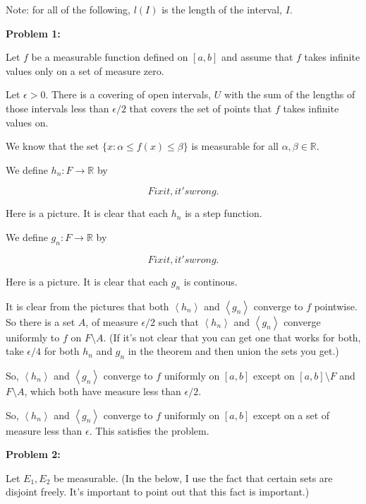 \documentclass[a4paper,12pt]{article}
\newcommand{\shunt}{\vspace{20mm}}
\newcommand{\anbrack}[1]{\left\langle #1 \right\rangle}
\newcommand{\al}{\alpha} %
\newcommand{\be}{\beta}
\newcommand{\ep}{\epsilon}
\newcommand{\R}{\mathbb{R}}
\begin{document}
Note: for all of the following, $l(I)$ is the length of the interval, $I$.

{\bf Problem 1:} %

Let $f$ be a measurable function defined on $[a,b]$ and assume that $f$ takes infinite values only on a set of measure zero. 

Let $\ep >0$. There is a covering of open intervals, $U$ with the sum of the lengths of those intervals less than $\ep/2$ that covers the set of points that $f$ takes infinite values on.

We know that the set $\{x: \al \leq f(x) \leq \be\}$ is measurable for all $\al, \be \in \R$. %

We define $h_n: F \to \R$ by

\begin{displaymath}
Fix it, it's wrong.
\end{displaymath} 

Here is a picture. It is clear that each $h_n$ is a step function.

\shunt 

We define $g_n: F \to \R$ by

\begin{displaymath}
Fix it, it's wrong.
\end{displaymath} 

Here is a picture. It is clear that each $g_n$ is continous.

\shunt

It is clear from the pictures that both $\anbrack{h_n}$ and $\anbrack{g_n}$ converge to $f$ pointwise. So there is a set $A$, of measure $\ep/2$ such that $\anbrack{h_n}$ and $\anbrack{g_n}$ converge uniformly to $f$ on $F \setminus A$. (If it's not clear that you can get one that works for both, take $\ep/4$ for both $h_n$ and $g_n$ in the theorem and then union the sets you get.)

So, $\anbrack{h_n}$ and $\anbrack{g_n}$ converge to $f$ uniformly on $[a,b]$ except on $[a,b] \setminus F$ and $F \setminus A$, which both have measure less than $\ep/2$.

So, $\anbrack{h_n}$ and $\anbrack{g_n}$ converge to $f$ uniformly on $[a,b]$ except on a set of measure less than $\ep$. This satisfies the problem.

\shunt

{\bf Problem 2:}

Let $E_1, E_2$ be measurable. (In the below, I use the fact that certain sets are disjoint freely. It's important to point out that this fact is important.)
\end{document}
